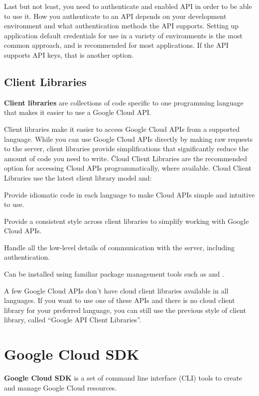 Last but not least, you need to authenticate and enabled API in order to be able to use it. How you authenticate to
an API depends on your development environment and what authentication methods the API supports. Setting up
application default credentials for use in a variety of environments is the most common approach, and is recommended
for most applications. If the API supports API keys, that is another option.

\subsection{Client Libraries}

\textbf{Client libraries} are collections of code specific to one programming language that makes it easier to use a
Google Cloud API\@.
\ed

Client libraries make it easier to access Google Cloud APIs from a supported language. While you can use Google Cloud
APIs directly by making raw requests to the server, client libraries provide simplifications that significantly
reduce the amount of code you need to write. \v

Cloud Client Libraries are the recommended option for accessing Cloud APIs programmatically, where available. Cloud
Client Libraries use the latest client library model and:
\bit
\item Provide idiomatic code in each language to make Cloud APIs simple and intuitive to use.
\item Provide a consistent style across client libraries to simplify working with Google Cloud APIs.
\item Handle all the low-level details of communication with the server, including authentication.
\item Can be installed using familiar package management tools such as  and .
\eit

A few Google Cloud APIs don't have cloud client libraries available in all languages. If you want to use one
of these APIs and there is no cloud client library for your preferred language, you can still use the previous style
of client library, called ``Google API Client Libraries''.

\section{Google Cloud SDK}

\textbf{Google Cloud SDK} is a set of command line interface (CLI) tools to create and manage Google Cloud resources.
\ed

